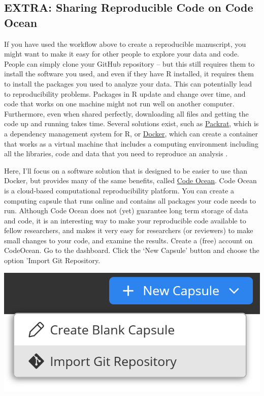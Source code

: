 \documentclass[
  oneside]{book}
\begin{document}
\hypertarget{extra-sharing-reproducible-code-on-code-ocean}{%
\subsection{EXTRA: Sharing Reproducible Code on Code Ocean}\label{extra-sharing-reproducible-code-on-code-ocean}}

If you have used the workflow above to create a reproducible manuscript, you might want to make it easy for other people to explore your data and code. People can simply clone your GitHub repository -- but this still requires them to install the software you used, and even if they have R installed, it requires them to install the packages you used to analyze your data. This can potentially lead to reproducibility problems. Packages in R update and change over time, and code that works on one machine might not run well on another computer. Furthermore, even when shared perfectly, downloading all files and getting the code up and running takes time. Several solutions exist, such as
\href{https://rstudio.github.io/packrat/rstudio.html}{Packrat}, which is a dependency management system for R, or \href{http://www.docker.com}{Docker}, which can create a container that works as a virtual machine that includes a computing environment including all the libraries, code and data that you need to reproduce an analysis \citep{wiebels_leveraging_2021}.

Here, I'll focus on a software solution that is designed to be easier to use than Docker, but provides many of the same benefits, called \href{https://codeocean.com/}{Code Ocean}. Code Ocean is a cloud-based computational reproducibility platform. You can create a computing capsule that runs online and contains all packages your code needs to run. Although Code Ocean does not (yet) guarantee long term storage of data and code, it is an interesting way to make your reproducible code available to fellow researchers, and makes it very easy for researchers (or reviewers) to make small changes to your code, and examine the results. Create a (free) account on CodeOcean. Go to the dashboard.
Click the `New Capsule' button and choose the option 'Import Git Repository.

\begin{center}\includegraphics[width=1\linewidth]{images/b27f6ddcc48c4b808418612be7efd929} \end{center}
\end{document}
